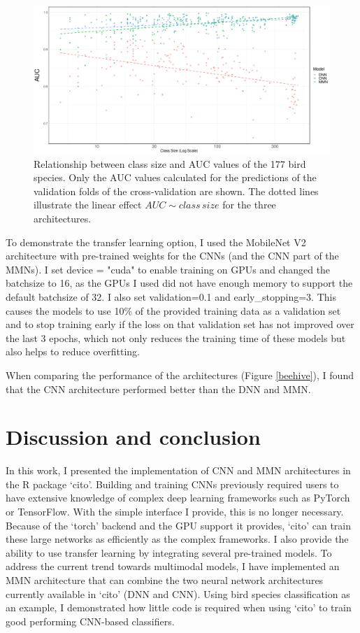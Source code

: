 \documentclass[12pt,twoside]{scrreport}
\newcommand{\pkg}[1]{`#1'}
\begin{document}
\begin{figure}[t]
	\includegraphics[width=\textwidth]{../analysis/results/figures/auc_classSize.pdf}
	\caption{Relationship between class size and AUC values of the 177 bird species. Only the AUC values calculated for the predictions of the validation folds of the cross-validation are shown. The dotted lines illustrate the linear effect $AUC \sim class\,size$ for the three architectures.}
	\label{classSize}
\end{figure}

To demonstrate the transfer learning option, I used the MobileNet V2 \citep{sandlerMobileNetV2InvertedResiduals2019} architecture with pre-trained weights for the CNNs (and the CNN part of the MMNs). I set device = "cuda" to enable training on GPUs and changed the batchsize to 16, as the GPUs I used did not have enough memory to support the default batchsize of 32. I also set validation=0.1 and early\_stopping=3. This causes the models to use 10\% of the provided training data as a validation set and to stop training early if the loss on that validation set has not improved over the last 3 epochs, which not only reduces the training time of these models but also helps to reduce overfitting.

When comparing the performance of the architectures (Figure \ref{beehive}), I found that the CNN architecture performed better than the DNN and MMN.


\chapter*{Discussion and conclusion}
In this work, I presented the implementation of CNN and MMN architectures in the R package \pkg{cito}. Building and training CNNs previously required users to have extensive knowledge of complex deep learning frameworks such as PyTorch or TensorFlow. With the simple interface I provide, this is no longer necessary. Because of the \pkg{torch} backend and the GPU support it provides, \pkg{cito} can train these large networks as efficiently as the complex frameworks. I also provide the ability to use transfer learning by integrating several pre-trained models. To address the current trend towards multimodal models, I have implemented an MMN architecture that can combine the two neural network architectures currently available in \pkg{cito} (DNN and CNN). Using bird species classification as an example, I demonstrated how little code is required when using \pkg{cito} to train good performing CNN-based classifiers.
\end{document}
